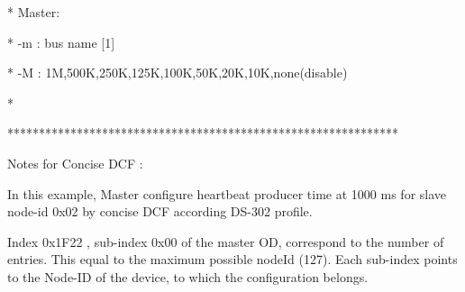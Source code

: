 \documentclass[a4paper,12pt]{book}
\begin{document}
{\ttfamily
* \space \space \space Master:
\space \space \space \space \space \space \space \space \space \space \space \space \space \space \space \space \space \space \space \space \space \space \space \space \space \space \space \space \space \space \space \space \space \space \space \space \space \space \space \space \space \space \space \space \space \space \space \space *}

{\ttfamily
* \space \space \space \space {}-m : bus name [{\textquotedbl}1{\textquotedbl}]
\space \space \space \space \space \space \space \space \space \space \space \space \space \space \space \space \space \space \space \space \space \space \space \space \space \space \space \space \space \space \space \space \space \space \space *}

{\ttfamily
* \space \space \space \space {}-M : 1M,500K,250K,125K,100K,50K,20K,10K,none(disable) \space *}

{\ttfamily
*
\space \space \space \space \space \space \space \space \space \space \space \space \space \space \space \space \space \space \space \space \space \space \space \space \space \space \space \space \space \space \space \space \space \space \space \space \space \space \space \space \space \space \space \space \space \space \space \space \space \space \space \space \space \space \space \space \space \space \space *}

{\ttfamily
**************************************************************}


\bigskip

{\sffamily
Notes for Concise DCF :}


\bigskip

{\sffamily
 In this example, Master configure \space heartbeat producer time at 1000 ms
for slave node{}-id 0x02 by concise DCF according DS{}-302 profile. }

{\sffamily
 }

{\sffamily
 Index 0x1F22 , sub{}-index 0x00 of the master OD, correspond to the
number of entries. This equal to the maximum possible nodeId (127).
Each sub{}-index points to the Node{}-ID of the device, to which the
configuration belongs. }


\bigskip
\end{document}
